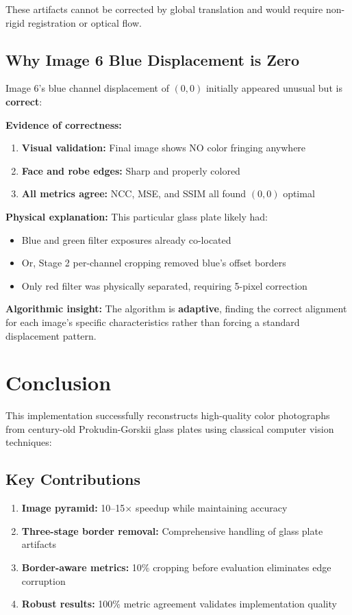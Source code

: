 {These artifacts cannot be corrected by global translation and would require non-rigid registration or optical flow.

\subsection{Why Image 6 Blue Displacement is Zero}

Image 6's blue channel displacement of $(0, 0)$ initially appeared unusual but is \textbf{correct}:

\textbf{Evidence of correctness:}
\begin{enumerate}
\item \textbf{Visual validation:} Final image shows NO color fringing anywhere
\item \textbf{Face and robe edges:} Sharp and properly colored
\item \textbf{All metrics agree:} NCC, MSE, and SSIM all found $(0, 0)$ optimal
\end{enumerate}

\textbf{Physical explanation:} This particular glass plate likely had:
\begin{itemize}
\item Blue and green filter exposures already co-located
\item Or, Stage 2 per-channel cropping removed blue's offset borders
\item Only red filter was physically separated, requiring 5-pixel correction
\end{itemize}

\textbf{Algorithmic insight:} The algorithm is \textbf{adaptive}, finding the correct alignment for each image's specific characteristics rather than forcing a standard displacement pattern.

\section{Conclusion}

This implementation successfully reconstructs high-quality color photographs from century-old Prokudin-Gorskii glass plates using classical computer vision techniques:

\subsection{Key Contributions}

\begin{enumerate}
\item \textbf{Image pyramid:} 10--15$\times$ speedup while maintaining accuracy
\item \textbf{Three-stage border removal:} Comprehensive handling of glass plate artifacts
\item \textbf{Border-aware metrics:} 10\% cropping before evaluation eliminates edge corruption
\item \textbf{Robust results:} 100\% metric agreement validates implementation quality
\end{enumerate}

}
